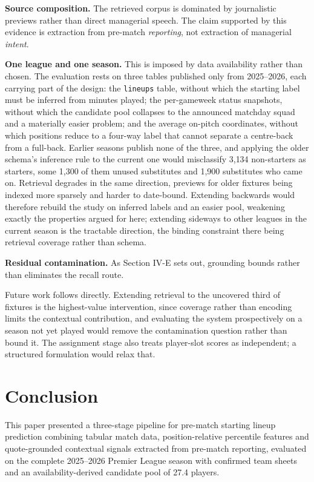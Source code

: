 \documentclass[conference]{IEEEtran}
\begin{document}
\textbf{Source composition.} The retrieved corpus is dominated by journalistic previews rather than direct managerial speech. The claim supported by this evidence is extraction from pre-match \emph{reporting}, not extraction of managerial \emph{intent}.

\textbf{One league and one season.} This is imposed by data availability rather than chosen. The evaluation rests on three tables published only from 2025--2026, each carrying part of the design: the \texttt{lineups} table, without which the starting label must be inferred from minutes played; the per-gameweek status snapshots, without which the candidate pool collapses to the announced matchday squad and a materially easier problem; and the average on-pitch coordinates, without which positions reduce to a four-way label that cannot separate a centre-back from a full-back. Earlier seasons publish none of the three, and applying the older schema's inference rule to the current one would misclassify 3{,}134 non-starters as starters, some 1{,}300 of them unused substitutes and 1{,}900 substitutes who came on. Retrieval degrades in the same direction, previews for older fixtures being indexed more sparsely and harder to date-bound. Extending backwards would therefore rebuild the study on inferred labels and an easier pool, weakening exactly the properties argued for here; extending sideways to other leagues in the current season is the tractable direction, the binding constraint there being retrieval coverage rather than schema.

\textbf{Residual contamination.} As Section IV-E sets out, grounding bounds rather than eliminates the recall route.

Future work follows directly. Extending retrieval to the uncovered third of fixtures is the highest-value intervention, since coverage rather than encoding limits the contextual contribution, and evaluating the system prospectively on a season not yet played would remove the contamination question rather than bound it. The assignment stage also treats player-slot scores as independent; a structured formulation would relax that.

\section{Conclusion}

This paper presented a three-stage pipeline for pre-match starting lineup prediction combining tabular match data, position-relative percentile features and quote-grounded contextual signals extracted from pre-match reporting, evaluated on the complete 2025--2026 Premier League season with confirmed team sheets and an availability-derived candidate pool of 27.4 players.
\end{document}
